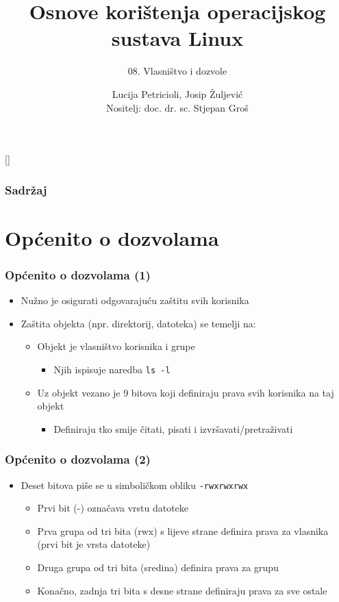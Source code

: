 \documentclass[table,usenames,dvipsnames]{beamer}
\title{Osnove korištenja operacijskog sustava Linux}
\subtitle{08. Vlasništvo i dozvole}
\author[Lucija Petricioli, Josip Žuljević]{Lucija Petricioli, Josip Žuljević\\{\small Nositelj: doc. dr. sc. Stjepan Groš}}
\institute[FER]{Sveučilište u Zagrebu \\
				Fakultet elektrotehnike i računarstva}
\date{\todayiso}
\newcommand{\shell}[1]{\texttt{#1}}
\begin{document}
{
[] %

\begin{frame}
\maketitle
\end{frame}
}

\begin{frame}
\frametitle{Sadržaj}
\tableofcontents
\end{frame}

\section{Općenito o dozvolama}
\begin{frame}[t]
\frametitle{Općenito o dozvolama (1)}
\begin{itemize}
  \item Nužno je osigurati odgovarajuću zaštitu svih korisnika
  \item Zaštita objekta (npr. direktorij, datoteka) se temelji na:
  \begin{itemize}
    \item Objekt je vlasništvo korisnika i grupe
    \begin{itemize}
      \item Njih ispisuje naredba \shell{ls -l}
    \end{itemize}
    \item Uz objekt vezano je 9 bitova koji definiraju prava svih
          korisnika na taj objekt
    \begin{itemize}
      \item Definiraju tko smije čitati, pisati i 
               izvršavati/pretraživati
    \end{itemize}
  \end{itemize}
\end{itemize}
\end{frame}

\begin{frame}[t]
\frametitle{Općenito o dozvolama (2)}
\begin{itemize}
  \item Deset bitova piše se u simboličkom obliku \shell{-rwxrwxrwx}
  \begin{itemize}
	\item Prvi bit (-) označava vrstu datoteke
    \item Prva grupa od tri bita (rwx) s lijeve strane definira prava za 
          vlasnika (prvi bit je vrsta datoteke)
    \item Druga grupa od tri bita (sredina) definira prava za grupu
    \item Konačno, zadnja tri bita s desne strane definiraju prava za sve 
          ostale
  \end{itemize}
\end{itemize}
\end{frame}
\end{document}
